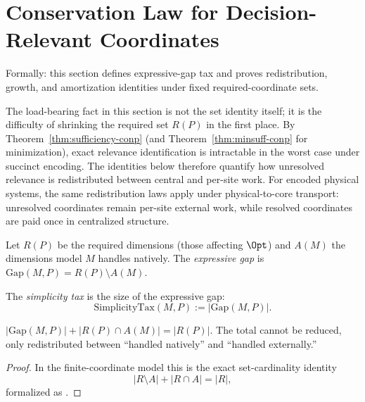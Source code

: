 \section{Conservation Law for Decision-Relevant Coordinates}\label{sec:simplicity-tax}

Formally: this section defines expressive-gap tax and proves redistribution, growth, and amortization identities under fixed required-coordinate sets.

The load-bearing fact in this section is not the set identity itself; it is the difficulty of shrinking the required set $R(P)$ in the first place. By Theorem~\ref{thm:sufficiency-conp} (and Theorem~\ref{thm:minsuff-conp} for minimization), exact relevance identification is intractable in the worst case under succinct encoding. The identities below therefore quantify how unresolved relevance is redistributed between central and per-site work.
For encoded physical systems, the same redistribution laws apply under physical-to-core transport: unresolved coordinates remain per-site external work, while resolved coordinates are paid once in centralized structure.

\begin{definition}
Let $R(P)$ be the required dimensions (those affecting $\Opt$) and $A(M)$ the dimensions model $M$ handles natively. The \emph{expressive gap} is $\text{Gap}(M,P) = R(P) \setminus A(M)$.
\end{definition}

\begin{definition}\label{def:simplicity-tax}
The \emph{simplicity tax} is the size of the expressive gap:
\[
\text{SimplicityTax}(M,P) := |\text{Gap}(M,P)|.
\]
\end{definition}

\begin{theorem}\label{thm:tax-conservation}
$|\text{Gap}(M, P)| + |R(P) \cap A(M)| = |R(P)|$. The total cannot be reduced, only redistributed between ``handled natively'' and ``handled externally.''
\end{theorem}

\begin{proof}
In the finite-coordinate model this is the exact set-cardinality identity
\[
|R\setminus A| + |R\cap A| = |R|,
\]
formalized as .
\end{proof}

